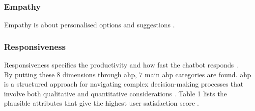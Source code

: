 \subsubsection{Empathy}
Empathy is about personalised options and suggestions \citep*{Muizzah2021, Verkeyn2018}.\\

\subsubsection{Responsiveness}
Responsiveness specifies the productivity and how fast the chatbot responds \citep*{Muizzah2021, Verkeyn2018}.\\
\break
By putting these 8 dimensions through \acrfull{ahp}, 7 main \acrshort{ahp} categories are found. \acrshort{ahp} is a structured approach for navigating complex decision-making processes that involve both qualitative and quantitative considerations \citep{Radziwil2021}. Table 1 lists the plausible attributes that give the highest user satisfaction score \citep{Muizzah2021}.\\

